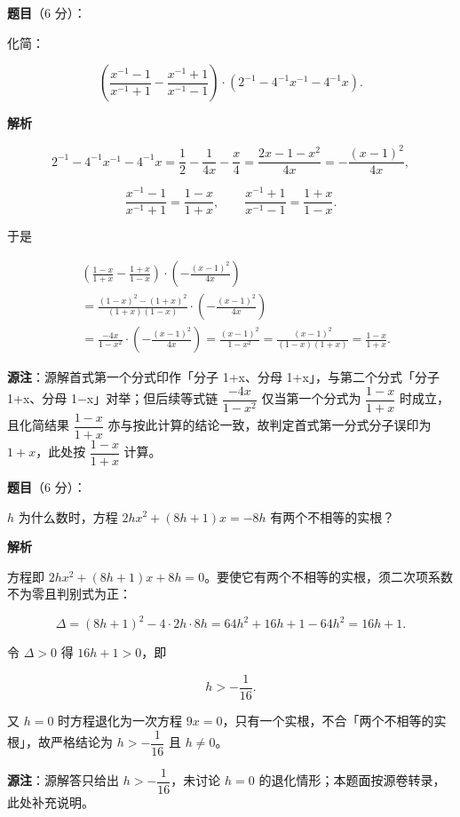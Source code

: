 \begin{answer}

\textbf{题目}（6 分）：

化简：

\nopagebreak[4]
\[
\left(\frac{x^{-1}-1}{x^{-1}+1}-\frac{x^{-1}+1}{x^{-1}-1}\right)\cdot\left(2^{-1}-4^{-1}x^{-1}-4^{-1}x\right).
\]

\textbf{解析}

\nopagebreak[4]
\[
2^{-1}-4^{-1}x^{-1}-4^{-1}x=\frac12-\frac{1}{4x}-\frac{x}{4}
=\frac{2x-1-x^2}{4x}=-\frac{(x-1)^2}{4x},
\]

\nopagebreak[4]
\[
\frac{x^{-1}-1}{x^{-1}+1}=\frac{1-x}{1+x},
\qquad
\frac{x^{-1}+1}{x^{-1}-1}=\frac{1+x}{1-x}.
\]

于是

\nopagebreak[4]
\[
\begin{aligned}
&\left(\frac{1-x}{1+x}-\frac{1+x}{1-x}\right)\cdot\left(-\frac{(x-1)^2}{4x}\right)\\
&=\frac{(1-x)^2-(1+x)^2}{(1+x)(1-x)}\cdot\left(-\frac{(x-1)^2}{4x}\right)\\
&=\frac{-4x}{1-x^2}\cdot\left(-\frac{(x-1)^2}{4x}\right)
=\frac{(x-1)^2}{1-x^2}
=\frac{(x-1)^2}{(1-x)(1+x)}
=\frac{1-x}{1+x}.
\end{aligned}
\]

\begin{gktip}
\textbf{源注}：源解首式第一个分式印作「分子 1+x、分母 1+x」，与第二个分式「分子 1+x、分母 1$-$x」对举；但后续等式链 $\dfrac{-4x}{1-x^2}$ 仅当第一个分式为 $\dfrac{1-x}{1+x}$ 时成立，且化简结果 $\dfrac{1-x}{1+x}$ 亦与按此计算的结论一致，故判定首式第一分式分子误印为 $1+x$，此处按 $\dfrac{1-x}{1+x}$ 计算。
\end{gktip}


\end{answer}
\begin{answer}

\textbf{题目}（6 分）：

$h$ 为什么数时，方程 $2hx^2+(8h+1)x=-8h$ 有两个不相等的实根？

\textbf{解析}

方程即 $2hx^2+(8h+1)x+8h=0$。要使它有两个不相等的实根，须二次项系数不为零且判别式为正：

\nopagebreak[4]
\[
\Delta=(8h+1)^2-4\cdot2h\cdot8h=64h^2+16h+1-64h^2=16h+1.
\]

令 $\Delta>0$ 得 $16h+1>0$，即

\nopagebreak[4]
\[
h>-\frac{1}{16}.
\]

又 $h=0$ 时方程退化为一次方程 $9x=0$，只有一个实根，不合「两个不相等的实根」，故严格结论为 $h>-\dfrac{1}{16}$ 且 $h\ne0$。

\begin{gktip}
\textbf{源注}：源解答只给出 $h>-\dfrac{1}{16}$，未讨论 $h=0$ 的退化情形；本题面按源卷转录，此处补充说明。
\end{gktip}


\end{answer}
